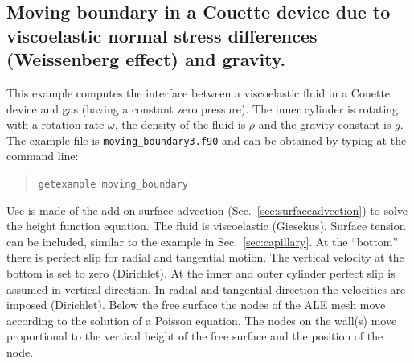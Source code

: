 \subsection{Moving boundary in a Couette device due to viscoelastic normal stress differences (Weissenberg effect) and gravity.}
\label{sec:weisseff}

This example computes the interface between a viscoelastic fluid in a Couette device and gas (having a constant zero pressure). 
The inner cylinder is rotating with a rotation rate $\omega$, 
 the density of the fluid is $\rho$ and the gravity constant is $g$.  
The example file is \texttt{moving\_boundary3.f90} and can
be obtained by typing at the
command line:
\begin{quote}
   \texttt{getexample moving\_boundary}
\end{quote}
Use is made of the add-on surface advection (Sec.~\ref{sec:surfaceadvection}) to solve the height function equation.
The fluid is viscoelastic (Giesekus). Surface tension can be included, similar to the example in Sec.~\ref{sec:capillary}. At the ``bottom'' there is perfect slip for radial and tangential motion. The vertical velocity at the bottom is set to zero (Dirichlet). At the inner and outer cylinder perfect slip is assumed in vertical direction. In radial and tangential direction the velocities are imposed (Dirichlet).
Below the free surface the nodes of the ALE mesh move according to the solution of a Poisson equation. The nodes on the wall(s) move proportional to the vertical height of the free surface and the position of the node.

